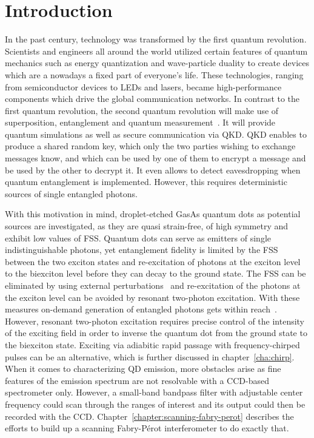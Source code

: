 \chapter{Introduction}

In the past century, technology was transformed by the first quantum revolution. Scientists and engineers all around the world utilized certain features of quantum mechanics such as energy quantization and wave-particle duality to create devices which are a nowadays a fixed part of everyone's life.
These technologies, ranging from semiconductor devices to LEDs and lasers, became high-performance components which drive the global communication networks.
In contrast to the first quantum revolution, the second quantum revolution will make use of superposition, entanglement and quantum measurement~\cite{macfarlane_quantum_2003}.
It will provide quantum simulations as well as secure communication via \ac{QKD}.
\ac{QKD} enables to produce a shared random key, which only the two parties wishing to exchange messages know, and which can be used by one of them to encrypt a message and be used by the other to decrypt it.
It even allows to detect eavesdropping when quantum entanglement is implemented.
However, this requires deterministic sources of single entangled photons.

With this motivation in mind, droplet-etched GasAs quantum dots as potential sources are investigated, as they are quasi strain-free, of high symmetry and exhibit low values of \ac{FSS}.
Quantum dots can serve as emitters of single indistinguishable photons, yet entanglement fidelity is limited by the \acs{FSS} between the two exciton states \cite{bayer_fine_2002} and re-excitation of photons at the exciton level to the biexciton level before they can decay to the ground state.
The \ac{FSS} can be eliminated by using external perturbations~\cite{plumhof_experimental_2012} and re-excitation of the photons at the exciton level can be avoided by resonant two-photon excitation.
With these measures on-demand generation of entangled photons gets within reach~\cite{jayakumar_deterministic_2013}.
However, resonant two-photon excitation requires precise control of the intensity of the exciting field in order to inverse the quantum dot from the ground state to the biexciton state.
Exciting via adiabitic rapid passage with frequency-chirped pulses can be an alternative, which is further discussed in chapter~\ref{cha:chirp}.
When it comes to characterizing \ac{QD} emission, more obstacles arise as fine features of the emission spectrum are not resolvable with a CCD-based spectrometer only.
However, a small-band bandpass filter with adjustable center frequency could scan through the ranges of interest and its output could then be recorded with the CCD.
Chapter~\ref{chapter:scanning-fabry-perot} describes the efforts to build up a scanning Fabry-Pérot interferometer to do exactly that.


